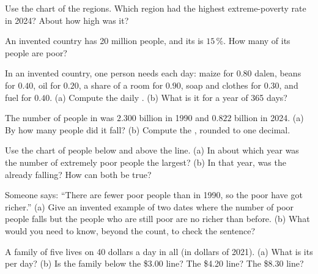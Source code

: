 \begin{exercise}[$\star$]\label{exo:g6:poverty:2}
Use the chart of the regions. Which region had the highest extreme-poverty rate
in 2024? About how high was it?
\end{exercise}

\begin{exercise}[$\star$]\label{exo:g6:poverty:3}
An invented country has 20 million people, and its  is $15\,\%$.
How many of its people are poor?
\end{exercise}

\begin{exercise}[$\star$]\label{exo:g6:poverty:4}
In an invented country, one person needs each day: maize for $0.80$ dalen,
beans for $0.40$, oil for $0.20$, a share of a room for $0.90$, soap and clothes
for $0.30$, and fuel for $0.40$. (a) Compute the daily . (b) What is
it for a year of 365 days?
\end{exercise}

\begin{exercise}[$\star\star$]\label{exo:g6:poverty:5}
The number of people in  was $2.300$ billion in 1990 and $0.822$
billion in 2024. (a) By how many people did it fall? (b) Compute the , rounded to one decimal.
\end{exercise}

\begin{exercise}[$\star\star$]\label{exo:g6:poverty:6}
Use the chart of people below and above the line. (a) In about which year was
the number of extremely poor people the largest? (b) In that year, was the
 already falling? How can both be true?
\end{exercise}

\begin{exercise}[$\star\star$]\label{exo:g6:poverty:7}
Someone says: ``There are fewer poor people than in 1990, so the poor have got
richer.'' (a) Give an invented example of two dates where the number of poor
people falls but the people who are still poor are no richer than before.
(b) What would you need to know, beyond the count, to check the sentence?
\end{exercise}

\begin{exercise}[$\star\star$]\label{exo:g6:poverty:8}
A family of five lives on 40 dollars a day in all (in dollars of 2021). (a) What
is its  per day? (b) Is the family below the \$3.00 line? The
\$4.20 line? The \$8.30 line?
\end{exercise}

